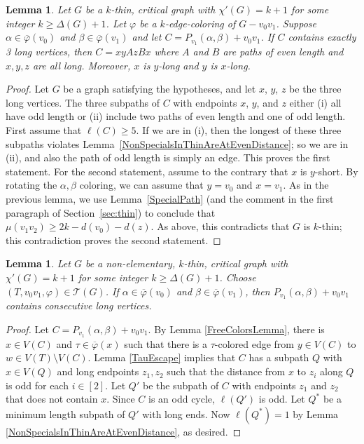 \documentclass[12pt]{amsart}
\theoremstyle{plain}
\newtheorem{lem}[thm]{Lemma}
\theoremstyle{definition}
\theoremstyle{remark}
\newcommand{\fancy}[1]{\mathcal{#1}}
\newcommand{\T}{\fancy{T}}
\newcommand{\irange}[1]{\left[#1\right]}
\newcommand{\vph}{\varphi}
\newcommand{\vphn}{\overline{\varphi}}
\begin{document}
\begin{lem}\label{ThreeNonSpecialOnCycle}
Let $G$ be a $k$-thin, critical graph with $\chi'(G) = k+1$ for some integer $k
\ge \Delta(G) + 1$.  Let $\vph$ be a $k$-edge-coloring of $G-v_0v_1$. Suppose
$\alpha \in \vphn(v_0)$ and $\beta \in \vphn(v_1)$ and let $C = P_{v_1}(\alpha,
\beta) + v_0v_1$.  If $C$ contains exactly 3 long vertices, then $C = xyAzBx$
where $A$ and $B$ are paths of even length and $x,y,z$ are all long.  Moreover,
$x$ is $y$-long and $y$ is $x$-long.
\end{lem}
\begin{proof}
Let $G$ be a graph satisfying the hypotheses, and let $x$, $y$, $z$ be the
three long vertices.
The three subpaths of $C$ with endpoints $x$,
$y$, and $z$ either (i) all have odd length or (ii) include two paths of even
length and one of odd length.  
First assume that $\ell(C)\ge 5$.  
If we are in (i), then the longest of these three subpaths
violates Lemma~\ref{NonSpecialsInThinAreAtEvenDistance}; so we are in (ii), and
also the path of odd length is simply an edge.  This proves the first statement.
For the second statement, assume to the contrary that $x$ is $y$-short.
By rotating the $\alpha,\beta$ coloring, we can assume that $y=v_0$ and $x=v_1$.
As in the previous lemma, we use Lemma~\ref{SpecialPath} (and the comment in the
first paragraph of Section~\ref{sec:thin}) to conclude that $\mu(v_1v_2)\ge
2k-d(v_0)-d(z)$.  As above, this contradicts that $G$ is $k$-thin; this
contradiction proves the second statement.
\end{proof}

\begin{lem}\label{ConsecutiveNonSpecials}
Let $G$ be a non-elementary, $k$-thin, critical graph with $\chi'(G) = k+1$ for
some integer $k \ge \Delta(G) + 1$.  Choose $(T, v_0v_1, \vph) \in \T(G)$. If
$\alpha \in \vphn(v_0)$ and $\beta \in \vphn(v_1)$, then $P_{v_1}(\alpha,
\beta) + v_0v_1$ contains consecutive long vertices.
\end{lem}
\begin{proof}
Let $C = P_{v_1}(\alpha, \beta) + v_0v_1$.  By Lemma \ref{FreeColorsLemma},
there is $x \in V(C)$ and $\tau \in \vphn(x)$ such that there is a
$\tau$-colored edge from $y \in V(C)$ to $w \in V(T) \setminus V(C)$.
Lemma \ref{TauEscape} implies that $C$ has a subpath $Q$ with $x \in V(Q)$
 and long endpoints $z_1,z_2$ such that the distance from $x$ to
$z_i$ along $Q$ is odd for each $i \in \irange{2}$.  
Let $Q'$ be the subpath of $C$ with endpoints $z_1$ and $z_2$ that does not contain
$x$. Since $C$ is an odd cycle, $\ell(Q')$ is odd.  Let $Q^*$ be a minimum
length subpath of $Q'$ with long ends.  Now $\ell(Q^*) = 1$ by Lemma
\ref{NonSpecialsInThinAreAtEvenDistance}, as desired.
\end{proof}
\end{document}
